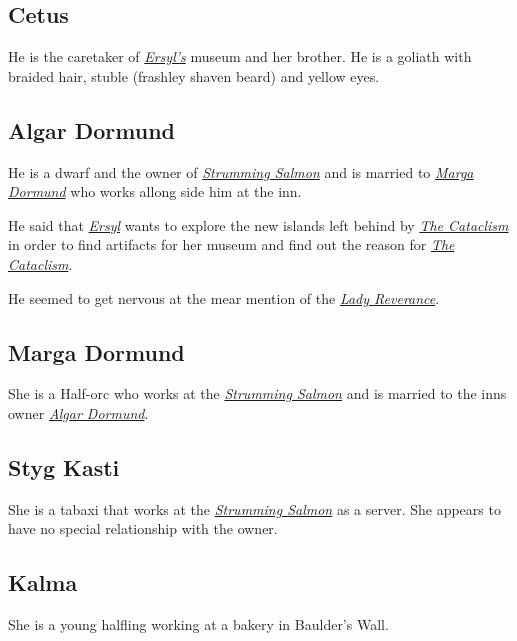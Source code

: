 \documentclass{article}
\begin{document}
\begin{multicols}{2}
    \subsection{Cetus}
    \label{cetus}

    He is the caretaker of \hyperref[ersyl]{\textit{Ersyl's}} museum and her brother. He is a goliath with braided hair, stuble (frashley shaven beard) and yellow eyes.

    \subsection{Algar Dormund}
    \label{algar}

    He is a dwarf and the owner of \hyperref[strumming_salmon]{\textit{Strumming Salmon}} and is married to \hyperref[marga]{\textit{Marga Dormund}} who works allong side him at the inn.

    He said that \hyperref[ersyl]{\textit{Ersyl}} wants to explore the new islands left behind by \hyperref[cataclism]{\textit{The Cataclism}} in order to find artifacts for her museum and find out the reason for
    \hyperref[cataclism]{\textit{The Cataclism}}.

    He seemed to get nervous at the mear mention of the \hyperref[gullsinger]{\textit{Lady Reverance}}.

    \subsection{Marga Dormund}
    \label{marga}

    She is a Half-orc who works at the \hyperref[strumming_salmon]{\textit{Strumming Salmon}} and is married to the inns owner \hyperref[algar]{\textit{Algar Dormund}}.

    \subsection{Styg Kasti}
    \label{styg}

    She is a tabaxi that works at the \hyperref[strumming_salmon]{\textit{Strumming Salmon}} as a server. She appears to have no special relationship with the owner.

    \subsection{Kalma}
    \label{kalma}

    She is a young halfling working at a bakery in Baulder's Wall.


\end{multicols}
\end{document}
